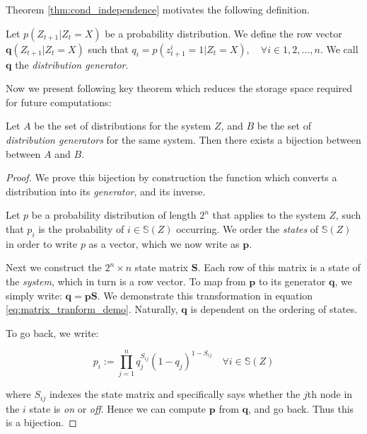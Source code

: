 Theorem \ref{thm:cond_independence} motivates the following definition.

\begin{definition}
	\label{thm:bijection}
	Let $p(Z_{t+1}|Z_t = X)$ be a probability distribution. We define the row vector $\mathbf{q}(Z_{t+1}|Z_t = X)$ such that $q_i = p(z^i_{t+1}=1|Z_t=X), \quad \forall i \in 1, 2, \ldots, n$. We call $\mathbf{q}$ the \textit{distribution generator}.
\end{definition}

Now we present following key theorem which reduces the storage space required for future computations:

\begin{theorem}
	Let $A$ be the set of distributions for the system $Z$, and $B$ be the set of \textit{distribution generators} for the same system. Then there exists a bijection between between $A$ and $B$.
\end{theorem}

\begin{proof}
	We prove this bijection by construction the function which converts a distribution into its \textit{generator}, and its inverse.
	
	Let $p$ be a probability distribution of length $2^n$ that applies to the system $Z$, such that $p_i$ is the probability of $i \in \mathbb{S}(Z)$ occurring. We order the \textit{states} of $\mathbb{S}(Z)$ in order to write $p$ as a vector, which we now write as $\mathbf{p}$. 
	
	Next we construct the $2^n \times n$ state matrix $\mathbf{S}$. Each row of this matrix is a state of the \textit{system}, which in turn is a row vector. To map from $\mathbf{p}$ to its generator $\mathbf{q}$, we simply write: $\mathbf{q} = \mathbf{p} \mathbf{S}$. We demonstrate this transformation in equation \ref{eq:matrix_tranform_demo}. Naturally, $\mathbf{q}$ is dependent on the ordering of states.
	
	To go back, we write:
	
	\begin{equation}
	\label{eq:map_inv}
	p_i := \prod \limits_{j=1}^{n} q_j^{S_{ij}} (1-q_j)^{1-S_{ij}}\quad \forall i \in \mathbb{S}(Z)
	\end{equation}
	
	where  $S_{ij}$  indexes the state matrix and specifically says whether the $j$th node in the $i$ state is \textit{on} or \textit{off}. Hence we can compute $\mathbf{p}$ from $\mathbf{q}$, and go back. Thus this is a bijection.
\end{proof}

